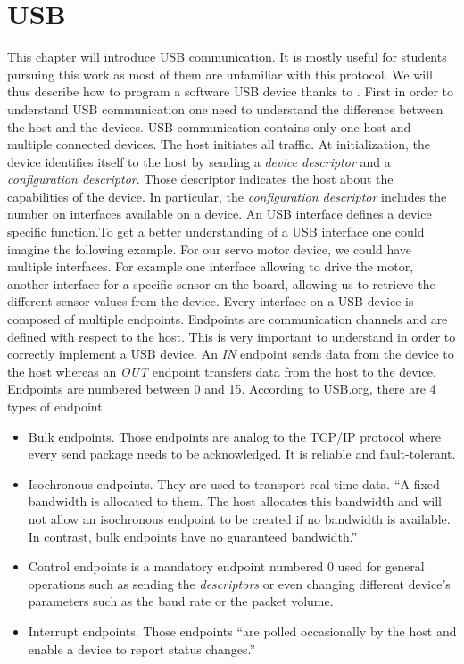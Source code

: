 \documentclass[12pt,a4paper]{report}
\begin{document}
\chapter{USB}
\label{chap:usb}
This chapter will introduce USB communication. It is mostly useful for students pursuing this work as most of them are unfamiliar with this protocol. We will thus describe how to program a software USB
device thanks to \cite{usb-explained}.\newline
First in order to understand USB communication one need to understand the difference between the host and the devices. USB communication contains only one host and multiple connected devices. The host initiates all traffic. At initialization, the device identifies itself to the host by sending a \emph{device descriptor} and a \emph{configuration descriptor}. Those descriptor indicates the host about the capabilities of the device. In particular, the \emph{configuration descriptor} includes the number on interfaces available on a device. An USB interface defines a device specific function.\newline To get a better understanding of a USB interface one could imagine the following example. For our servo motor device, we could have multiple interfaces. For example one interface allowing to drive the motor, another interface for a specific sensor on the board, allowing us to retrieve the different sensor values from the device.\newline
Every interface on a USB device is composed of multiple endpoints. Endpoints are communication channels and are defined with respect to the host. This is very important to understand in order to correctly implement a USB device.\newline
An \emph{IN} endpoint sends data from the device to the host whereas an \emph{OUT} endpoint transfers data from the host to the device. Endpoints are numbered between 0 and 15.\newline
According to USB.org, there are 4 types of endpoint.
\begin{itemize}
    \item Bulk endpoints. Those endpoints are analog to the TCP/IP protocol where every send package needs to be acknowledged. It is reliable and fault-tolerant.
    \item Isochronous endpoints. They are used to transport real-time data. ``A fixed bandwidth is allocated to them. The host allocates this bandwidth and will not allow an isochronous endpoint to be created if no bandwidth is available. In contrast, bulk endpoints have no guaranteed bandwidth.''
    \item Control endpoints is a mandatory endpoint numbered 0 used for general operations such as sending the \emph{descriptors} or even changing different device's parameters such as the baud rate or the packet volume.
    \item Interrupt endpoints. Those endpoints ``are polled occasionally by the host and enable a device to report status changes.''
\end{itemize}
\end{document}
